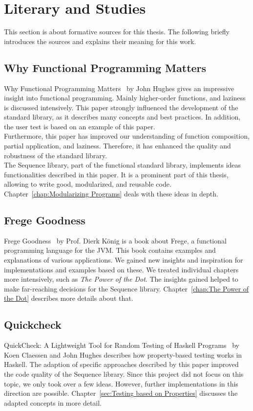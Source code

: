 \section{Literary and Studies}
\label{sec:Literary and Studies}
This section is about formative sources for this thesis. The following briefly
introduces the sources and explains their meaning for this work.

\subsection{Why Functional Programming Matters}
\label{sub:Functional Programming Matters}

Why Functional Programming Matters~\cite{hughes_why_1989} by John Hughes gives
an impressive insight into functional programming. Mainly higher-order
functions, and laziness is discussed intensively. This paper strongly
influenced the development of the standard library, as it describes many
concepts and best practices. In addition, the user test is based on an example
of this paper. \\ 
Furthermore, this paper has improved our understanding of function composition,
partial application, and laziness. Therefore, it has enhanced the quality and
robustness of the standard library. \\
The Sequence library, part of the functional standard library, implements ideas
functionalities described in this paper. It is a prominent part of this thesis,
allowing to write good, modularized, and reusable code.
Chapter~\ref{chap:Modularizing Programs} deals with these ideas in depth.


\subsection{Frege Goodness}
\label{sub:Frege Goodness}
Frege Goodness~\cite{frege_goodness} by Prof. Dierk König is a book about
Frege, a functional programming language for the JVM. This book contains
examples and explanations of various applications. We gained new insights and
inspiration for implementations and examples based on these. We treated
individual chapters more intensively, such as \textit{The Power of the Dot}.
The insights gained helped to make far-reaching decisions for the Sequence
library. Chapter~\ref{chap:The Power of the Dot} describes more details about
that.

\subsection{Quickcheck}
\label{sub:Quickcheck}
QuickCheck: A Lightweight Tool for Random Testing of Haskell
Programs~\cite{quickcheck_hughes} by Koen Claessen and John Hughes describes
how property-based testing works in Haskell. The adaption of specific
approaches described by this paper improved the code quality of the Sequence
library. Since this project did not focus on this topic, we only took over a few
ideas. However, further implementations in this direction are possible.
Chapter~\ref{sec:Testing based on Properties} discusses the adapted
concepts in more detail. 

